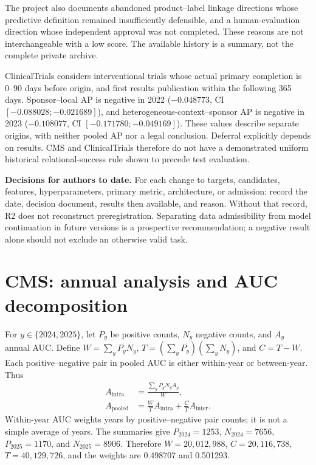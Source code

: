 \documentclass[10pt,a4paper]{article}
\begin{document}
The project also documents abandoned product--label linkage directions whose predictive definition remained insufficiently defensible, and a human-evaluation direction whose independent approval was not completed. These reasons are not interchangeable with a low score. The available history is a summary, not the complete private archive\cite{hgbhistory}.

ClinicalTrials considers interventional trials whose actual primary completion is 0--90 days before origin, and first results publication within the following 365 days. Sponsor--local AP is negative in 2022 ($-0.048773$, CI $[-0.088028;-0.021689]$), and heterogeneous-context--sponsor AP is negative in 2023 ($-0.108077$, CI $[-0.171780;-0.049169]$). These values describe separate origins, with neither pooled AP nor a legal conclusion. Deferral explicitly depends on results. CMS and ClinicalTrials therefore do not have a demonstrated uniform historical relational-success rule shown to precede test evaluation.

\textbf{Decisions for authors to date.} For each change to targets, candidates, features, hyperparameters, primary metric, architecture, or admission: record the date, decision document, results then available, and reason. Without that record, R2 does not reconstruct preregistration. Separating data admissibility from model continuation in future versions is a prospective recommendation; a negative result alone should not exclude an otherwise valid task.

\section{CMS: annual analysis and AUC decomposition}
\label{supp:cms}
\begin{table}[!htbp]\centering\small
\caption{CMS metrics transcribed from the frozen analysis. 2023 is validation; 2024 and 2025 are test splits. AP follows the code's ranking convention.}

\end{table}

For $y\in\{2024,2025\}$, let $P_y$ be positive counts, $N_y$ negative counts, and $A_y$ annual AUC. Define $W=\sum_y P_yN_y$, $T=(\sum_y P_y)(\sum_y N_y)$, and $C=T-W$. Each positive--negative pair in pooled AUC is either within-year or between-year. Thus
\begin{align}
A_{\mathrm{intra}}&=\frac{\sum_y P_yN_y A_y}{W},\\
A_{\mathrm{pooled}}&=\frac{W}{T}A_{\mathrm{intra}}+\frac{C}{T}A_{\mathrm{inter}}.
\end{align}
Within-year AUC weights years by positive--negative pair counts; it is not a simple average of years. The summaries give $P_{2024}=1253$, $N_{2024}=7656$, $P_{2025}=1170$, and $N_{2025}=8906$. Therefore $W=20,012,988$, $C=20,116,738$, $T=40,129,726$, and the weights are 0.498707 and 0.501293.
\end{document}
